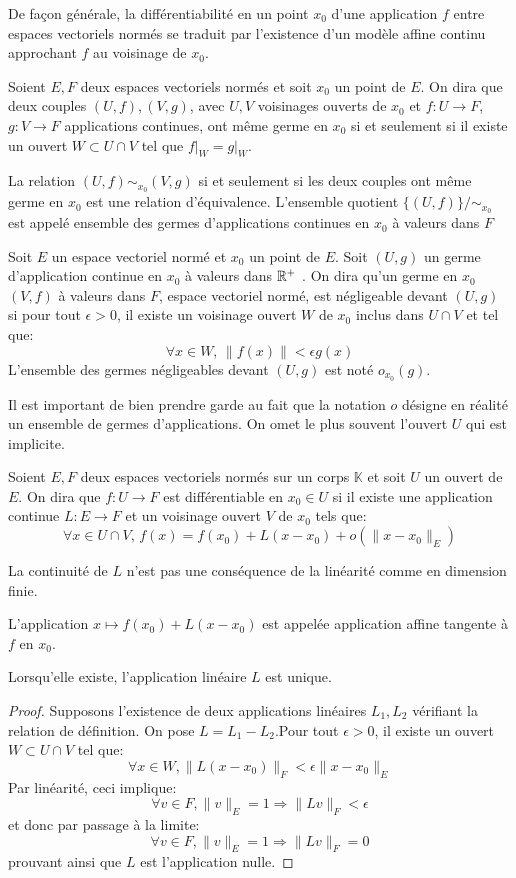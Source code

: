 De façon générale, la différentiabilité en un point $x_0$ d'une application $f$ entre espaces vectoriels normés se traduit par l'existence d'un modèle affine continu approchant $f$ au voisinage de $x_0$.
\begin{defn}
Soient $E,F$ deux espaces vectoriels normés et soit $x_0$ un point de $E$. On dira que deux couples $(U,f),(V,g)$, avec $U,V$ voisinages ouverts de $x_0$ et $f\colon U \to F$,$g \colon V \to F$ applications continues, ont même germe en $x_0$ si et seulement si il existe un ouvert $W \subset U \cap V$ tel que $f\rvert_{W}=g\rvert_{W}$.
\end{defn}
\begin{prop}
La relation $(U,f) \sim_{x_0} (V,g)$ si et seulement si les deux couples ont même germe en $x_0$ est une relation d'équivalence. L'ensemble quotient $\{(U,f)\} / \sim_{x_0}$ est appelé ensemble des germes d'applications continues en $x_0$ à valeurs dans $F$ 
\end{prop}
\begin{defn}
Soit $E$ un espace vectoriel normé et $x_0$ un point de $E$. Soit $(U,g)$ un germe d'application continue en $x_0$ à valeurs dans $\mathbb R^+$ . On dira qu'un germe en $x_0$ $(V,f)$ à valeurs dans $F$, espace vectoriel normé,  est négligeable devant $(U,g)$ si pour tout $\epsilon > 0$, il existe un voisinage ouvert $W$ de $x_0$ inclus dans $U\cap V$ et tel que:
\[
\forall x \in W, \, \|f(x)\| < \epsilon g(x)
\]
L'ensemble des germes négligeables devant $(U,g)$ est noté $o_{x_0}(g)$.
\end{defn}
\begin{rem}
Il est important de bien prendre garde au fait que la notation $o$ désigne en réalité un ensemble de germes d'applications. On omet le plus souvent l'ouvert $U$ qui est implicite. \end{rem}
\begin{fdefn}
Soient $E,F$ deux espaces vectoriels normés sur un corps $\mathbb{K}$
 et soit $U$ un ouvert de $E$. On dira que $f \colon U \to F$ est différentiable en $x_0 \in U$ si il existe une application continue $L \colon E \to F$ et un voisinage ouvert $V$ de $x_0$ tels que:
 \[
 \forall x \in U \cap V, \, f(x) = f(x_0) + L(x-x_0) + o(\|x-x_0\|_E)
 \]
\end{fdefn}
\begin{rem}
La continuité de $L$ n'est pas une conséquence de la linéarité comme en dimension finie. 
\end{rem}
L'application $ x \mapsto f(x_0) + L(x-x_0)$ est appelée application affine tangente à $f$ en $x_0$.
\begin{prop}
Lorsqu'elle existe, l'application linéaire $L$ est unique.
\end{prop}
\begin{proof}
Supposons l'existence de deux applications linéaires  $L_1, L_2$ vérifiant la relation de définition. On pose $L =  L_1 - L_2$.Pour tout $\epsilon > 0$, il existe un ouvert $W \subset U \cap V$ tel que:
\[
\forall x \in W, \|L(x-x_0)\|_F < \epsilon \| x-x_0 \|_E
\]
Par linéarité, ceci implique:
\[
\forall v \in F, \|v\|_E = 1 \Rightarrow \|L v \|_F < \epsilon 
\]
et donc par passage à la limite:
\[
\forall v \in F, \|v\|_E = 1 \Rightarrow \|L v \|_F = 0
\]
prouvant ainsi que $L$ est l'application nulle.
\end{proof}
